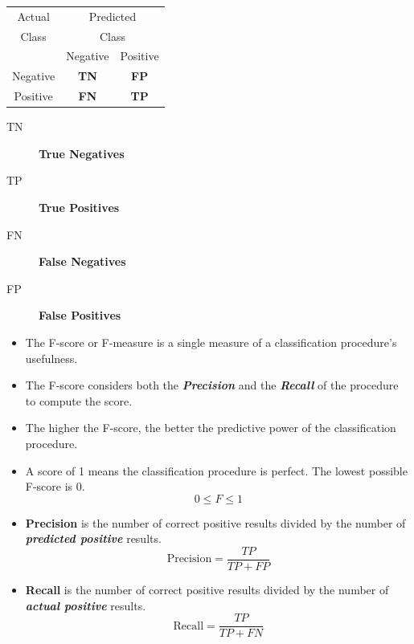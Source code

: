 \documentclass[]{report}
\begin{document}


{

\centering
\begin{table}[!htbp]

\begin{tabular}{c | *2c }
Actual  & \multicolumn{2}{c}{Predicted}\\
Class  & \multicolumn{2}{c}{Class}\\

{}   & Negative & Positive       \\
Negative  &  \textbf{TN} & \textbf{FP}  \\
Positive   &  \textbf{FN} & \textbf{TP}  \\
\end{tabular}
\end{table}
}
\begin{description}
\item[TN] \textbf{True Negatives} 
\item[TP] \textbf{True Positives} 
\item[FN] \textbf{False Negatives}
\item[FP] \textbf{False Positives} 
\end{description}






\begin{itemize}
\item The F-score or F-measure is a single measure of a classification procedure's usefulness. 
\item The F-score considers both the \textit{\textbf{Precision}} and the \textit{\textbf{Recall}} of the procedure to compute the score.
\item The higher the F-score, the better the predictive power of the 
classification procedure. 
\item A score of 1 means the classification procedure is perfect. The lowest possible F-score is 0.
\[ 0 \leq F \leq 1 \]
\end{itemize}




\begin{itemize}
\item \textbf{Precision} is the number of correct positive results divided by the number of \textit{\textbf{predicted positive}} results.
\[ \mbox{Precision}= \frac{TP}{TP+FP}  \]
\item \textbf{Recall} is the number of correct positive results divided by the number of \textit{\textbf{actual positive}} results. 
\[ \mbox{Recall}= \frac{TP}{TP+FN}  \]
\end{itemize}
\end{document}
